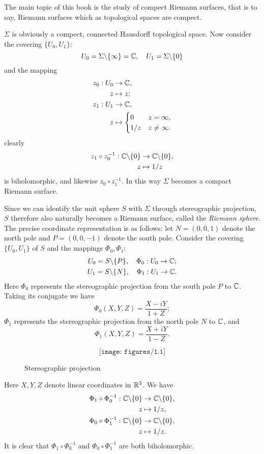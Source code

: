 The main topic of this book is the study of compect Riemann surfaces, that is to say, Riemann surfaces which as topological spaces are compect. 
\begin{example}[The set of extended complex numbers $\Sigma=\C\cup\{\infty\}$ (one point compactification of complex numbers)]
    $\Sigma$ is obviously a compect, connected Hausdorff topological space. Now consider the covering $\{U_0,U_1\}$: 
    \[U_0=\Sigma\backslash\{\infty\}=\mathbb{C}, \quad U_1=\Sigma\backslash\{0\}\]
    and the mapping 
    \begin{align*}
        z_0:U_0&\to\mathbb{C}, \\
        z&\mapsto z; \\
        z_1:U_1&\to\mathbb{C}, \\
        z&\mapsto\begin{cases}
            0&z=\infty, \\
            1/z&z\neq\infty. 
        \end{cases}
    \end{align*}
    clearly
    \begin{align*}
        z_1\circ z_0^{-1}:\mathbb{C}\backslash\{0\}&\to\mathbb{C}\backslash\{0\}, \\
        z&\mapsto1/z
    \end{align*}
    is biholomorphic, and likewise $z_0\circ z_1^{-1}$. In this way $\Sigma$ becomes a compact Riemann surface. 

    Since we can identify the unit sphere $S$ with $\Sigma$ through stereographic projection, $S$ therefore also naturally becomes a Riemann surface, called the \textit{Riemann sphere}. The precise coordinate representation is as follows: let $N=(0,0,1)$ denote the north pole and $P=(0,0,-1)$ denote the south pole. Consider the covering $\{U_0,U_1\}$ of $S$ and the mappings $\Phi_0,\Phi_1$: 
    \begin{gather*}
        U_0=S\backslash\{P\}, \quad\Phi_0:U_0\to\mathbb{C}; \\
        U_1=S\backslash\{N\}, \quad\Phi_1:U_1\to\mathbb{C}. 
    \end{gather*}
    Here $\Phi_0$ represents the stereographic projection from the south pole $P$ to $\mathbb{C}$. Taking its conjugate we have 
    \[\Phi_0(X,Y,Z)=\frac{X-iY}{1+Z}; \]
    $\Phi_1$ represents the stereographic projection from the north pole $N$ to $\mathbb{C}$, and 
    \[\Phi_1(X,Y,Z)=\frac{X+iY}{1-Z}. \]
    \begin{figure}[h]
        \[\texttt{[image: figures/1.1]}\]
        \caption{Stereographic projection}
    \end{figure}
    Here $X,Y,Z$ denote linear coordinates in $\mathbb{R}^3$. We have 
    \begin{align*}
        \Phi_1\circ\Phi_0^{-1}:\mathbb{C}\backslash\{0\}&\to\mathbb{C}\backslash\{0\}, \\
        z&\mapsto1/z, \\
        \Phi_0\circ\Phi_1^{-1}:\mathbb{C}\backslash\{0\}&\to\mathbb{C}\backslash\{0\}, \\
        z&\mapsto1/z. 
    \end{align*}
    It is clear that $\Phi_1\circ\Phi_0^{-1}$ and $\Phi_0\circ\Phi_1^{-1}$ are both biholomorphic. 


\end{example}
